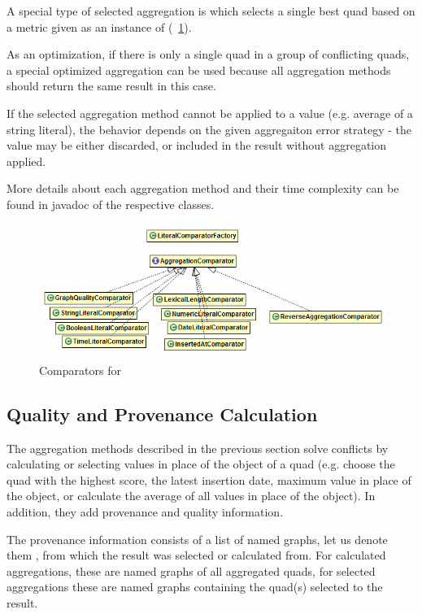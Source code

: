 A special type of selected aggregation is  which selects a single best quad based on a metric given as an instance of  (\figurename~\ref{fig:crComparators}).

As an optimization, if there is only a single quad in a group of conflicting quads, a special optimized  aggregation can be used because all aggregation methods should return the same result in this case.

If the selected aggregation method cannot be applied to a value (e.g. average of a string literal), the behavior depends on the given aggregaiton error strategy - the value may be either discarded, or included in the result without aggregation applied.

More details about each aggregation method and their time complexity can be found in javadoc of the respective classes.

\begin{figure}[htb]
    \centering
    \includegraphics[width=\textwidth]{images/dia-cr-comparators.png}
    \caption{Comparators for }
	\label{fig:crComparators}
\end{figure}
	
\subsection{Quality and Provenance Calculation}
The aggregation methods described in the previous section solve conflicts by calculating or selecting values in place of the object of a quad (e.g. choose the quad with the highest \QA score, the latest insertion date, maximum value in place of the object, or calculate the average of all values in place of the object). In addition, they add provenance and quality information.

The provenance information consists of a list of named graphs, let us denote them , from which the result was selected or calculated from. For calculated aggregations, these are named graphs of all aggregated quads, for selected aggregations these are named graphs containing the quad(s) selected to the result.

